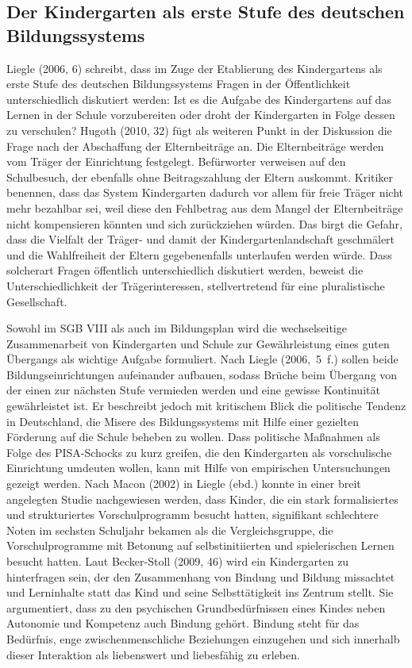 \subsection{Der Kindergarten als erste Stufe des deutschen Bildungssystems}
Liegle (2006, 6) schreibt, dass im Zuge der Etablierung des Kindergartens als erste Stufe des deutschen Bildungssystems Fragen in der Öffentlichkeit unterschiedlich diskutiert werden: Ist es die Aufgabe des Kindergartens auf das Lernen in der Schule vorzubereiten oder droht der Kindergarten in Folge dessen zu verschulen? Hugoth (2010, 32) fügt als weiteren Punkt in der Diskussion die Frage nach der Abschaffung der Elternbeiträge an. Die Elternbeiträge werden vom Träger der Einrichtung festgelegt. Befürworter verweisen auf den Schulbesuch, der ebenfalls ohne Beitragszahlung der Eltern auskommt. Kritiker benennen, dass das System Kindergarten dadurch vor allem für freie Träger nicht mehr bezahlbar sei, weil diese den Fehlbetrag aus dem Mangel der Elternbeiträge nicht kompensieren könnten und sich zurückziehen würden. Das birgt die Gefahr, dass die Vielfalt der Träger- und damit der Kindergartenlandschaft geschmälert und die Wahlfreiheit der Eltern gegebenenfalls unterlaufen werden würde. Dass solcherart Fragen öffentlich unterschiedlich diskutiert werden, beweist die Unterschiedlichkeit der Trägerinteressen, stellvertretend für eine pluralistische Gesellschaft. 

Sowohl im SGB VIII als auch im Bildungsplan wird die wechselseitige Zusammenarbeit von Kindergarten und Schule zur Gewährleistung eines guten Übergangs als wichtige Aufgabe formuliert. Nach Liegle (2006,~5~f.) sollen beide Bildungseinrichtungen aufeinander aufbauen, sodass Brüche beim Übergang von der einen zur nächsten Stufe vermieden werden und eine gewisse Kontinuität gewährleistet ist. Er beschreibt jedoch mit kritischem Blick die politische Tendenz in Deutschland, die Misere des Bildungssystems mit Hilfe einer gezielten Förderung auf die Schule beheben zu wollen.
Dass politische Maßnahmen als Folge des PISA-Schocks zu kurz greifen, die den Kindergarten als vorschulische Einrichtung umdeuten wollen, kann mit Hilfe von empirischen Untersuchungen gezeigt werden. Nach  Macon (2002) in Liegle (ebd.) konnte in einer breit angelegten Studie nachgewiesen werden, dass Kinder, die ein stark formalisiertes und strukturiertes Vorschulprogramm besucht hatten, signifikant schlechtere Noten im sechsten Schuljahr bekamen als die Vergleichsgruppe, die Vorschulprogramme mit Betonung auf selbstinitiierten und spielerischen Lernen besucht hatten. 
Laut Becker-Stoll (2009, 46) wird ein Kindergarten zu hinterfragen sein, der den Zusammenhang von Bindung und Bildung missachtet und Lerninhalte statt das Kind und seine Selbsttätigkeit ins Zentrum stellt. Sie argumentiert, dass zu den psychischen Grundbedürfnissen eines Kindes neben Autonomie und Kompetenz auch Bindung gehört. Bindung steht für das Bedürfnis, enge zwischenmenschliche Beziehungen einzugehen und sich innerhalb dieser Interaktion als liebenswert und liebesfähig zu erleben. 
 
